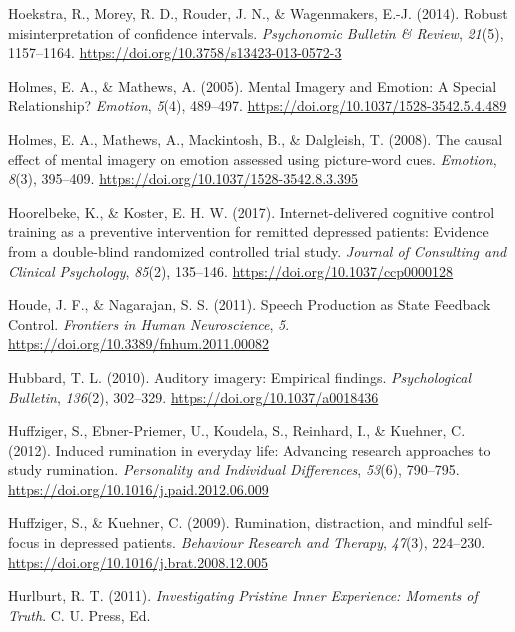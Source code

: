 \documentclass[a4paper,12pt,twoside,onecolumn,openright,final,oldfontcommands]{memoir}
\begin{document}
\leavevmode\hypertarget{ref-Hoekstra2014}{}%
Hoekstra, R., Morey, R. D., Rouder, J. N., \& Wagenmakers, E.-J. (2014). Robust misinterpretation of confidence intervals. \emph{Psychonomic Bulletin \& Review}, \emph{21}(5), 1157--1164. \url{https://doi.org/10.3758/s13423-013-0572-3}

\leavevmode\hypertarget{ref-holmes_mental_2005}{}%
Holmes, E. A., \& Mathews, A. (2005). Mental Imagery and Emotion: A Special Relationship? \emph{Emotion}, \emph{5}(4), 489--497. \url{https://doi.org/10.1037/1528-3542.5.4.489}

\leavevmode\hypertarget{ref-holmes_causal_2008}{}%
Holmes, E. A., Mathews, A., Mackintosh, B., \& Dalgleish, T. (2008). The causal effect of mental imagery on emotion assessed using picture-word cues. \emph{Emotion}, \emph{8}(3), 395--409. \url{https://doi.org/10.1037/1528-3542.8.3.395}

\leavevmode\hypertarget{ref-hoorelbeke_internet-delivered_2017}{}%
Hoorelbeke, K., \& Koster, E. H. W. (2017). Internet-delivered cognitive control training as a preventive intervention for remitted depressed patients: Evidence from a double-blind randomized controlled trial study. \emph{Journal of Consulting and Clinical Psychology}, \emph{85}(2), 135--146. \url{https://doi.org/10.1037/ccp0000128}

\leavevmode\hypertarget{ref-houde_speech_2011}{}%
Houde, J. F., \& Nagarajan, S. S. (2011). Speech Production as State Feedback Control. \emph{Frontiers in Human Neuroscience}, \emph{5}. \url{https://doi.org/10.3389/fnhum.2011.00082}

\leavevmode\hypertarget{ref-hubbard_auditory_2010}{}%
Hubbard, T. L. (2010). Auditory imagery: Empirical findings. \emph{Psychological Bulletin}, \emph{136}(2), 302--329. \url{https://doi.org/10.1037/a0018436}

\leavevmode\hypertarget{ref-Huffziger2012}{}%
Huffziger, S., Ebner-Priemer, U., Koudela, S., Reinhard, I., \& Kuehner, C. (2012). Induced rumination in everyday life: Advancing research approaches to study rumination. \emph{Personality and Individual Differences}, \emph{53}(6), 790--795. \url{https://doi.org/10.1016/j.paid.2012.06.009}

\leavevmode\hypertarget{ref-Huffziger2009}{}%
Huffziger, S., \& Kuehner, C. (2009). Rumination, distraction, and mindful self-focus in depressed patients. \emph{Behaviour Research and Therapy}, \emph{47}(3), 224--230. \url{https://doi.org/10.1016/j.brat.2008.12.005}

\leavevmode\hypertarget{ref-Hurlburt2011}{}%
Hurlburt, R. T. (2011). \emph{Investigating Pristine Inner Experience: Moments of Truth}. C. U. Press, Ed.
\end{document}
